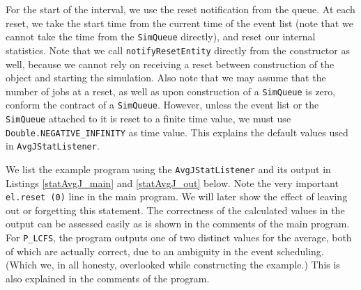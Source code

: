 \documentclass[12pt]{book}
\begin{document}
For the start of the interval, we use the reset notification from the queue.
At each reset, we take the start time from the current time of the
  event list (note that we cannot take the time from the \lstinline-SimQueue- directly),
  and reset our internal statistics.
Note that we call \lstinline|notifyResetEntity| directly from the constructor as well,
  because we cannot rely on receiving a reset between construction of the object
  and starting the simulation.
Also note that we may assume that the number of jobs at a reset,
  as well as upon construction of a \lstinline-SimQueue- is zero,
  conform the contract of a \lstinline-SimQueue-.
However, unless the event list or the \lstinline-SimQueue- attached to it
  is reset to a finite time value,
  we must use \lstinline-Double.NEGATIVE_INFINITY- as time value.
This explains the default values used in
  \lstinline-AvgJStatListener-.

We list the example program using the \lstinline|AvgJStatListener|
  and its output in
  Listings \ref{statAvgJ_main}
  and
  \ref{statAvgJ_out}
  below.
Note the very important \lstinline-el.reset (0)- line in the main program.
We will later show the effect of leaving out or forgetting this statement.
The correctness of the calculated values in the output
  can be assessed easily
  as is shown in the comments of the main program.
For \lstinline-P_LCFS-, the program outputs one of two distinct values for the average,
  both of which are actually correct, due to an ambiguity in the event scheduling.
(Which we, in all honesty, overlooked while constructing the example.)
This is also explained in the comments of the program.
\end{document}
